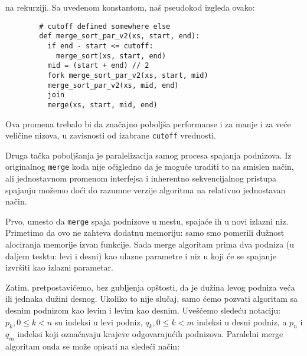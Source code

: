 \documentclass[a4paper,11pt]{article}
\begin{document}
    na rekurziji. Sa uvedenom konstantom, naš pseudokod izgleda ovako:
    \begin{verbatim}
        # cutoff defined somewhere else
        def merge_sort_par_v2(xs, start, end):
          if end - start <= cutoff:
            merge_sort(xs, start, end)
          mid = (start + end) // 2
          fork merge_sort_par_v2(xs, start, mid)
          merge_sort_par_v2(xs, mid, end)
          join
          merge(xs, start, mid, end)
    \end{verbatim}
    Ova promena trebalo bi da značajno poboljša performanse i za manje i za veće veličine nizova, u zavisnosti
    od izabrane \verb|cutoff| vrednosti.\par
    Druga tačka poboljšanja je paralelizacija samog procesa spajanja podnizova. Iz originalnog \verb|merge|
    koda nije očigledno da je moguće uraditi to na smislen način, ali jednostavnom promenom interfejsa
    i inherentno sekvencijalnog pristupa spajanju možemo doći do razumne verzije algoritma na relativno
    jednostavan način.\par
    Prvo, umesto da \verb|merge| spaja podnizove u mestu, spajaće ih u novi izlazni niz. Primetimo da ovo
    ne zahteva dodatnu memoriju: samo smo pomerili dužnost alociranja memorije izvan funkcije. Sada
    merge algoritam prima dva podniza (u daljem tesktu: levi i desni) kao ulazne parametre i niz u koji
    će se spajanje izvršiti kao izlazni parametar.\par
    Zatim, pretpostavićemo, bez gubljenja opštosti, da je dužina levog podniza veća ili jednaka dužini desnog.
    Ukoliko to nije slučaj, samo ćemo pozvati algoritam sa desnim podnizom kao levim i levim kao desnim.
    Uvešćemo sledeću notaciju: $p_k , 0 \le k < n$ su indeksi u levi podniz, $q_k , 0 \le k < m$ indeksi
    u desni podniz, a $p_n$ i $q_m$ indeksi koji označavaju krajeve odgovarajućih podnizova.
     Paralelni merge algoritam onda se može opisati na sledeći način:
\end{document}
